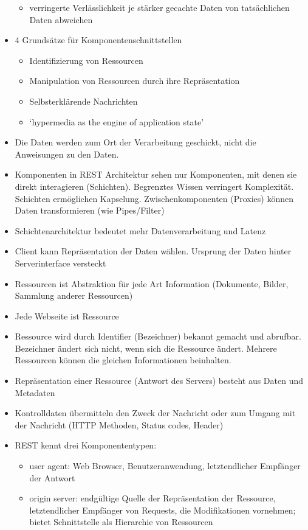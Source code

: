 \begin{itemize}
\begin{itemize}
    \item verringerte Verlässlichkeit je stärker gecachte Daten von tatsächlichen Daten abweichen
  \end{itemize}
  \item 4 Grundsätze für Komponentenschnittstellen
  \begin{itemize}
    \item Identifizierung von Ressourcen
    \item Manipulation von Ressourcen durch ihre Repräsentation
    \item Selbsterklärende Nachrichten
    \item `hypermedia as the engine of application state'
  \end{itemize}
  \item Die Daten werden zum Ort der Verarbeitung geschickt, nicht die Anweisungen zu den Daten.
  \item Komponenten in REST Architektur sehen nur Komponenten, mit denen sie direkt interagieren (Schichten). Begrenztes Wissen verringert Komplexität. Schichten ermöglichen Kapselung. Zwischenkomponenten (Proxies) können Daten transformieren (wie Pipes/Filter)
  \item Schichtenarchitektur bedeutet mehr Datenverarbeitung und Latenz
  \item Client kann Repräsentation der Daten wählen. Ursprung der Daten hinter Serverinterface versteckt
  \item Ressourcen ist Abstraktion für jede Art Information (Dokumente, Bilder, Sammlung anderer Ressourcen)
  \item Jede Webseite ist Ressource
  \item Ressource wird durch Identifier (Bezeichner) bekannt gemacht und abrufbar. Bezeichner ändert sich nicht, wenn sich die Ressource ändert. Mehrere Ressourcen können die gleichen Informationen beinhalten.
  \item Repräsentation einer Ressource (Antwort des Servers) besteht aus Daten und Metadaten
  \item Kontrolldaten übermitteln den Zweck der Nachricht oder zum Umgang mit der Nachricht (HTTP Methoden, Status codes, Header)
  \item REST kennt drei Komponententypen:
  \begin{itemize}
    \item user agent: Web Browser, Benutzeranwendung, letztendlicher Empfänger der Antwort
    \item origin server: endgültige Quelle der Repräsentation der Ressource, letztendlicher Empfänger von Requests, die Modifikationen vornehmen; bietet Schnittstelle als Hierarchie von Ressourcen

\end{itemize}
\end{itemize}
